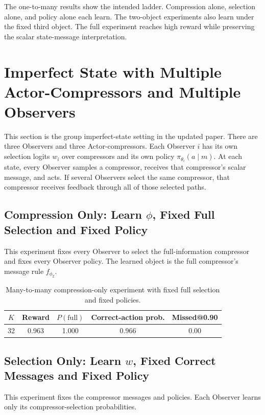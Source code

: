 \documentclass[11pt]{article}
\begin{document}
The one-to-many results show the intended ladder. Compression alone, selection
alone, and policy alone each learn. The two-object experiments also learn under
the fixed third object. The full experiment reaches high reward while preserving
the scalar state-message interpretation.

\section{Imperfect State with Multiple Actor-Compressors and Multiple Observers}

This section is the group imperfect-state setting in the updated paper. There
are three Observers and three Actor-compressors. Each Observer \(i\) has its
own selection logits \(w_i\) over compressors and its own policy
\(\pi_{\theta_i}(a\mid m)\). At each state, every Observer samples a compressor,
receives that compressor's scalar message, and acts. If several Observers
select the same compressor, that compressor receives feedback through all of
those selected paths.

\subsection{Compression Only: Learn \(\phi\), Fixed Full Selection and Fixed Policy}

This experiment fixes every Observer to select the full-information compressor
and fixes every Observer policy. The learned object is the full compressor's
message rule \(f_{\phi_2}\).

\begin{table}[H]
\centering
\small
\begin{tabular}{ccccc}
\toprule
\(K\) & Reward & \(P(\mathrm{full})\) & Correct-action prob. & Missed@0.90 \\
\midrule
32 & 0.963 & 1.000 & 0.966 & 0.00 \\
\bottomrule
\end{tabular}
\caption{Many-to-many compression-only experiment with fixed full selection and
fixed policies.}
\label{tab:many-to-many-phi-only}
\end{table}

\subsection{Selection Only: Learn \(w\), Fixed Correct Messages and Fixed Policy}

This experiment fixes the compressor messages and policies. Each Observer learns
only its compressor-selection probabilities.
\end{document}
